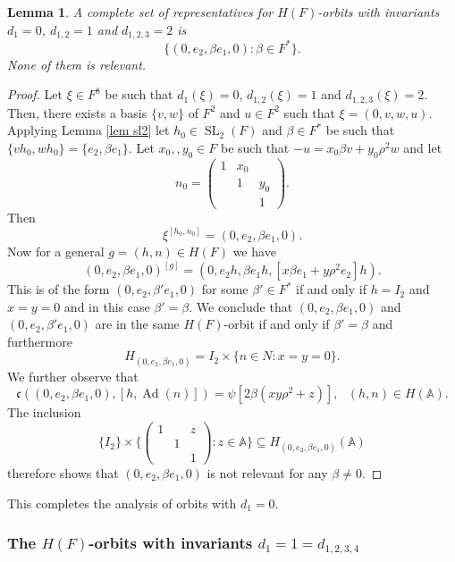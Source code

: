 \documentclass[12pt]{amsart}
\newcommand{\SL}{\operatorname{SL}}
\newcommand{\Ad}{\operatorname{Ad}}
\newcommand{\A}{\mathbb{A}}
\renewcommand{\c}{\mathfrak{c}}
\newtheorem{lemma}[theorem]{Lemma}
\theoremstyle{remark}
\begin{document}
\begin{lemma}
A complete set of representatives for $H(F)$-orbits with invariants $d_1=0$, $d_{1,2}=1$ and $d_{1,2,3}=2$ is 
\[
\{(0,e_2,\beta e_1,0):\beta\in F^*\}.
\]
None of them is relevant.
\end{lemma}
\begin{proof}
Let $\xi\in F^8$ be such that $d_1(\xi)=0$, $d_{1,2}(\xi)=1$ and $d_{1,2,3}(\xi)=2$. Then, there exists a basis $\{v,w\}$ of $F^2$ and $u\in F^2$ such that $\xi=(0,v,w,u)$. Applying Lemma \ref{lem sl2} let $h_0\in \SL_2(F)$ and $\beta\in F^*$ be such that $\{vh_0,wh_0\}=\{e_2,\beta e_1\}$. Let $x_0,
,y_0\in F$ be such that $-u=x_0 \beta v+y_0\rho^2 w$ and let
\[
n_0=\begin{pmatrix}
1 & x_0 &  \\ & 1 & y_0 \\ & & 1
\end{pmatrix}.
\] 
Then
\[
\xi^{[h_0,n_0]}=(0,e_2,\beta e_1,0).
\]
 Now for a general $g=(h,n)\in H(F)$ we have
\[
(0,e_2,\beta e_1,0)^{[g]}=(0,e_2 h,\beta e_1 h,[x\beta e_1+y\rho^2 e_2] h).
\]
This is of the form $(0,e_2,\beta' e_1,0)$ for some  $\beta'\in F^*$ if and only if $h=I_2$ and $x=y=0$ and in this case $\beta'=\beta$. We conclude that $(0,e_2,\beta e_1,0)$ and $(0,e_2,\beta' e_1,0)$ are in the same $H(F)$-orbit if and only if $\beta'=\beta$ and furthermore 
\[
H_{(0,e_2,\beta e_1,0)}=I_2 \times \{n\in N: x=y=0\}.
\] 
We further observe that 
\[
\c((0,e_2,\beta e_1,0),[h,\Ad(n)])=\psi[2\beta(xy\rho^2+z)], \ \ \ (h,n)\in H(\A).
\] 
The inclusion
\[
\{I_2\}\times \{\begin{pmatrix}
1 &  & z \\ & 1 &  \\ & & 1
\end{pmatrix}:z\in \A\}\subseteq H_{(0,e_2,\beta e_1,0)}(\A)
\]
therefore shows that ${(0,e_2,\beta e_1,0)}$ is not relevant for any $\beta\ne 0$. 
\end{proof}

This completes the analysis of orbits with $d_1=0$. 

\subsubsection{The $H(F)$-orbits with invariants $d_1=1=d_{1,2,3,4}$}
\end{document}
